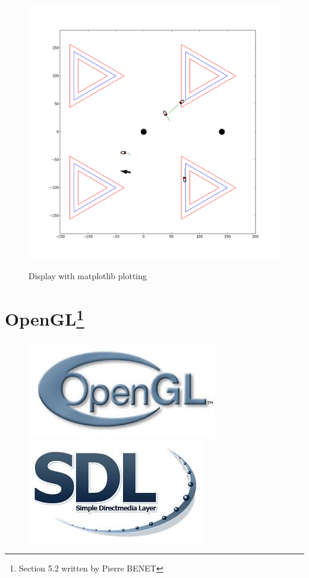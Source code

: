 \documentclass[a4paper]{report}
\begin{document}
\begin{figure}[H]
  \centering
  \includegraphics[scale = 0.4]{image/display3.png}
  \label{Flow}
  \caption{Display with matplotlib plotting }
\end{figure}




\section[OpenGl]{OpenGL\footnote{Section 5.2 written by Pierre BENET}}

\begin{figure}[htbp]
  \begin{minipage}[b]{0.4\textwidth}
  \centering
    \includegraphics[scale =0.3]{image/opengl.jpeg}
  \end{minipage}
  \hfill
  \begin{minipage}[b]{0.4\textwidth}
  \centering
    \includegraphics[scale = 0.3]{image/SDL.jpeg}
  \end{minipage}
\end{figure}
\end{document}
